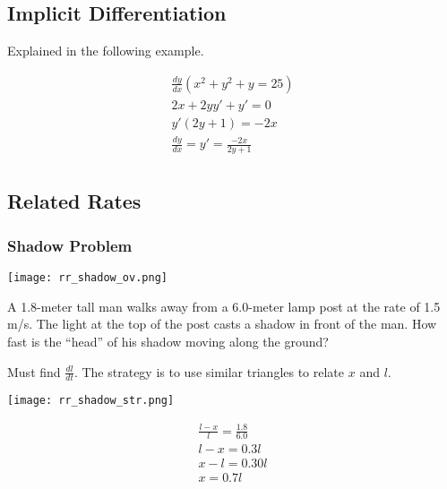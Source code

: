 \subsection{Implicit Differentiation}\label{subsec:implicit-differentiation}

\begin{center}
    Explained in the following example.
\end{center}

\begin{gather*}
    \frac{dy}{dx}(x^2+y^2+y=25)\\
    2x+2yy'+y'=0\\
    y'(2y+1)=-2x\\
    \frac{dy}{dx}=y'=\frac{-2x}{2y+1}\\
\end{gather*}

\subsection{Related Rates}

\subsubsection{Shadow Problem}

\begin{center}
    \texttt{[image: rr\_shadow\_ov.png]}
\end{center}

A 1.8-meter tall man walks away from a 6.0-meter lamp post at the rate of 1.5 m/s. 
The light at the top of the post casts a shadow in front of the man. 
How fast is the “head” of his shadow moving along the ground?

\vspace{5mm} 

Must find $\frac{dl}{dt}$. 
The strategy is to use similar triangles to relate $x$ and $l$.

\begin{center}
    \texttt{[image: rr\_shadow\_str.png]}
\end{center}

\begin{gather*}
    \frac{l-x}{l}=\frac{1.8}{6.0}\\
    l-x=0.3l\\
    x-l=0.30l\\
    x=0.7l\\
\end{gather*}

